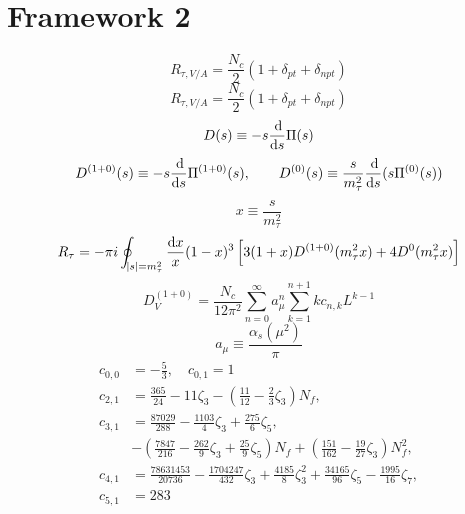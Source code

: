 \documentclass[12pt,a4paper]{scrreprt}
\begin{document}
\section{Framework 2}
\begin{equation*}
  R_{\tau,V/A} = \frac{N_c}{2} (1 + \delta_{pt} + \delta_{npt})
\end{equation*}
\begin{equation*}
  R_{\tau,V/A} = \frac{N_c}{2} (1 + \delta_{pt} + \delta_{npt})
\end{equation*}
\begin{equation*}
  D(s) \equiv -s \frac{\dif}{\dif s} \Pi(s)
\end{equation*}
\begin{equation*}
  D^{(1+0)}(s) \equiv -s \frac{\dif}{\dif s} \Pi^{(1+0)}(s), \qquad D^{(0)}(s) \equiv \frac{s}{m_\tau^2} \frac{\dif}{\dif s} (s \Pi^{(0)}(s))
\end{equation*}
\begin{equation*}
  x \equiv \frac{s}{m_\tau^2}
\end{equation*}
\begin{equation*}
  R_\tau = -\pi i \oint_{\abs{s}=m_\tau^2} \frac{\dif x}{x}(1-x)^3 \left[ 3(1+x)D^{(1+0)}(m_\tau^2x) + 4 D^{0}(m_\tau^2 x) \right]
\end{equation*}
\begin{equation*}
  D_V^{(1+0)} = \frac{N_c}{12 \pi^2}\sum_{n=0}^\infty a_\mu^n \sum_{k=1}^{n+1} k c_{n,k} L^{k-1}
\end{equation*}
\begin{equation*}
  a_\mu \equiv \frac{\alpha_s(\mu^2)}{\pi}
\end{equation*}
\begin{align*}
  c_{0,0} &= -\frac{5}{3}, \quad c_{0,1} = 1 \\
  c_{2,1} &= \frac{365}{24} - 11 \zeta_3 - \left( \frac{11}{12} - \frac{2}{3}\zeta_3 \right) N_f, \\
  c_{3,1} &= \frac{87029}{288} - \frac{1103}{4} \zeta_3 + \frac{275}{6}\zeta_5, \\
          &- \left( \frac{7847}{216} - \frac{262}{9} \zeta_3 + \frac{25}{9} \zeta_5 \right) N_f + \left( \frac{151}{162} - \frac{19}{27}\zeta_3\right)N_f^2, \\
  c_{4,1} &= \frac{78631453}{20736} - \frac{1704247}{432}\zeta_3 +
            \frac{4185}{8}\zeta_3^2 + \frac{34165}{96}\zeta_5 - \frac{1995}{16}\zeta_7, \\
  c_{5,1} &= 283
\end{align*}
\end{document}
